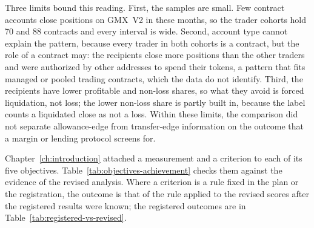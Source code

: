 Three limits bound this reading. First, the samples are small. Few contract accounts close positions on GMX~V2 in these months, so the trader cohorts hold 70 and 88 contracts and every interval is wide. Second, account type cannot explain the pattern, because every trader in both cohorts is a contract, but the role of a contract may: the recipients close more positions than the other traders and were authorized by other addresses to spend their tokens, a pattern that fits managed or pooled trading contracts, which the data do not identify. Third, the recipients have lower profitable and non-loss shares, so what they avoid is forced liquidation, not loss; the lower non-loss share is partly built in, because the label counts a liquidated close as not a loss. Within these limits, the comparison did not separate allowance-edge from transfer-edge information on the outcome that a margin or lending protocol screens for.


Chapter~\ref{ch:introduction} attached a measurement and a criterion to each of its five objectives. Table~\ref{tab:objectives-achievement} checks them against the evidence of the revised analysis. Where a criterion is a rule fixed in the plan or the registration, the outcome is that of the rule applied to the revised scores after the registered results were known; the registered outcomes are in Table~\ref{tab:registered-vs-revised}.

